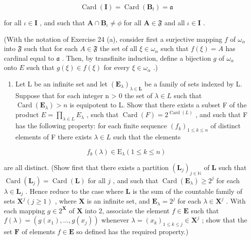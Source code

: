 \[
\operatorname{Card} (\mathbf {I}) = \operatorname{Card} \left(\mathbf {B} _ {t}\right) = \mathfrak {a}
\]

for all \(\iota\in\mathbf{I}\) , and such that \(\mathbf{A}\cap\mathbf{B}_{\iota}\neq\phi\) for all \(\mathbf{A}\in\mathfrak{F}\) and all \(\iota\in\mathbf{I}\) .

(With the notation of Exercise 24 (a), consider first a surjective mapping \(f\) of \(\omega_{\alpha}\) into \(\mathfrak{F}\) such that for each \(A \in \mathfrak{F}\) the set of all \(\xi \in \omega_{\alpha}\) such that \(f(\xi) = A\) has cardinal equal to \(\mathfrak{a}\) . Then, by transfinite induction, define a bijection \(g\) of \(\omega_{\alpha}\) onto \(E\) such that \(g(\xi) \in f(\xi)\) for every \(\xi \in \omega_{\alpha}\) .)

\begin{enumerate}
\def\labelenumi{\arabic{enumi}.}
\setcounter{enumi}{26}
\tightlist
\item
  Let L be an infinite set and let \((\mathbf{E}_{\lambda})_{\lambda \in \mathbf{L}}\) be a family of sets indexed by L. Suppose that for each integer n \textgreater{} 0 the set of \(\lambda \in L\) such that \(\operatorname{Card}(\mathbf{E}_{\lambda}) > n\) is equipotent to L. Show that there exists a subset F of the product \(E = \prod_{\lambda \in L} E_{\lambda}\) , such that \(\operatorname{Card}(F) = 2^{\operatorname{Card}(L)}\) , and such that F has the following property: for each finite sequence \((f_k)_{1 \leqslant k \leqslant n}\) of distinct elements of F there exists \(\lambda \in L\) such that the elements
\end{enumerate}

\[
f _ {k} (\lambda) \in \mathrm{E} _ {\lambda} (1 \leqslant k \leqslant n)
\]

are all distinct. (Show first that there exists a partition \((\mathbf{L}_j)_{j \in \mathbb{N}}\) of \(\mathbf{L}\) such that \(\operatorname{Card}(\mathbf{L}_j) = \operatorname{Card}(\mathbf{L})\) for all \(j\) , and such that \(\operatorname{Card}(\mathbf{E}_{\lambda}) \geqslant 2^j\) for each \(\lambda \in \mathbf{L}_j\) . Hence reduce to the case where \(\mathbf{L}\) is the sum of the countable family of sets \(\mathbf{X}^j (j \geqslant 1)\) , where \(\mathbf{X}\) is an infinite set, and \(\mathbf{E}_{\lambda} = 2^j\) for each \(\lambda \in \mathbf{X}^j\) . With each mapping \(g \in 2^{\mathbf{X}}\) of \(\mathbf{X}\) into 2, associate the element \(f \in \mathbf{E}\) such that \(f(\lambda) = (g(x_1), \ldots, g(x_j))\) whenever \(\lambda = (x_k)_{1 \leqslant k \leqslant j} \in \mathbf{X}^j\) ; show that the set \(\mathbf{F}\) of elements \(f \in \mathbf{E}\) so defined has the required property.)

